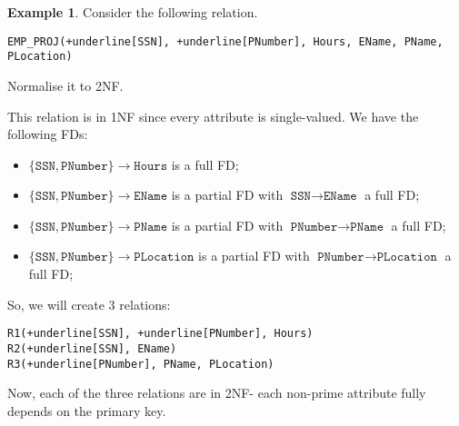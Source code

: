\documentclass[a4paper, openany]{memoir}
\theoremstyle{definition}
\newtheorem{example}[subsection]{Example}
\begin{document}
    \begin{example}
        Consider the following relation.
\begin{Verbatim}[commandchars=+\[\]]
EMP_PROJ(+underline[SSN], +underline[PNumber], Hours, EName, PName, PLocation)
\end{Verbatim}
    Normalise it to 2NF.
    \end{example}
    \begin{answer}
        This relation is in 1NF since every attribute is single-valued. We have the following FDs:
        \begin{itemize}
            \item $\{\texttt{SSN}, \texttt{PNumber}\} \to \texttt{Hours}$ is a full FD;
            \item $\{\texttt{SSN}, \texttt{PNumber}\} \to \texttt{EName}$ is a partial FD with $\texttt{SSN} \to \texttt{EName}$ a full FD;
            \item $\{\texttt{SSN}, \texttt{PNumber}\} \to \texttt{PName}$ is a partial FD with $\texttt{PNumber} \to \texttt{PName}$ a full FD;
            \item $\{\texttt{SSN}, \texttt{PNumber}\} \to \texttt{PLocation}$ is a partial FD with $\texttt{PNumber} \to \texttt{PLocation}$ a full FD;
        \end{itemize}
        So, we will create 3 relations:
\begin{Verbatim}[commandchars=+\[\]]
R1(+underline[SSN], +underline[PNumber], Hours)
R2(+underline[SSN], EName)
R3(+underline[PNumber], PName, PLocation)
\end{Verbatim}
        Now, each of the three relations are in 2NF- each non-prime attribute fully depends on the primary key.
    \end{answer}
\end{document}
